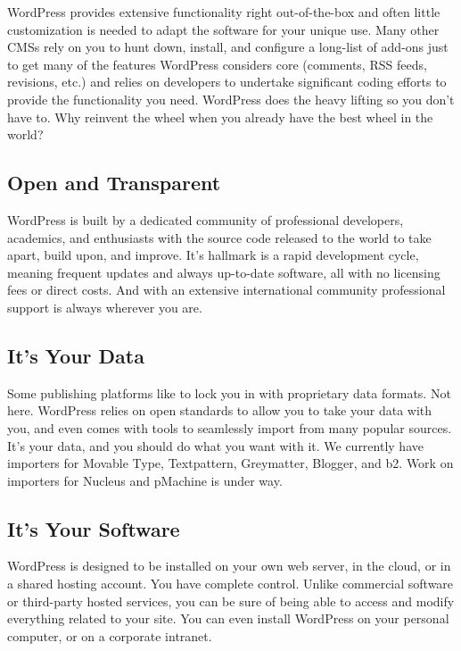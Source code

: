 WordPress provides extensive functionality right out-of-the-box and often little customization is needed to adapt the software for your unique use. Many other CMSs rely on you to hunt down, install, and configure a long-list of add-ons just to get many of the features WordPress considers core (comments, RSS feeds, revisions, etc.) and relies on developers to undertake significant coding efforts to provide the functionality you need. WordPress does the heavy lifting so you don’t have to. Why reinvent the wheel when you already have the best wheel in the world?

\subsection{Open and Transparent}

WordPress is built by a dedicated community of professional developers, academics, and enthusiasts with the source code released to the world to take apart, build upon, and improve. It’s hallmark is a rapid development cycle, meaning frequent updates and always up-to-date software, all with no licensing fees or direct costs. And with an extensive international community professional support is always wherever you are.

\subsection{It's Your Data}

Some publishing platforms like to lock you in with proprietary data formats. Not here. WordPress relies on open standards to allow you to take your data with you, and even comes with tools to seamlessly import from many popular sources. It’s your data, and you should do what you want with it. We currently have importers for Movable Type, Textpattern, Greymatter, Blogger, and b2. Work on importers for Nucleus and pMachine is under way.

\subsection{It's Your Software}

WordPress is designed to be installed on your own web server, in the cloud, or in a shared hosting account. You have complete control. Unlike commercial software or third-party hosted services, you can be sure of being able to access and modify everything related to your site. You can even install WordPress on your personal computer, or on a corporate intranet.

